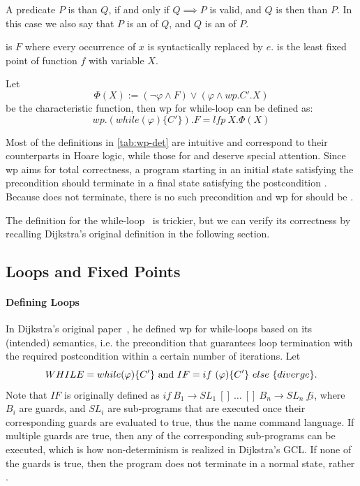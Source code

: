 A predicate $P$ is  than $Q$, if and only if $Q\implies P$ is valid, and $Q$ is then  than $P$. 
In this case we also say that $P$ is an  of $Q$, and $Q$ is an  of $P$. 

 is $F$ where every occurrence of $x$ is syntactically replaced by $e$. 
 is the least fixed point of function $f$ with variable $X$. 

Let {$$\Phi(X):=(\neg\varphi\wedge F)\vee(\varphi\wedge wp.C'.X)$$} be the characteristic function, then wp for while-loop can be defined as: 
{$$wp.(while(\varphi)\{C'\}).F = lfp\ X. \Phi(X)$$}

Most of the definitions in \autoref{tab:wp-det} are intuitive and correspond to their counterparts in Hoare logic, while those for  and  deserve special attention. 
Since wp aims for total correctness, a program starting in an initial state satisfying the precondition  should terminate in a final state satisfying the postcondition . 
Because  does not terminate, there is no such precondition and wp for  should be . 

The definition for the while-loop~\cite{kaminski19} is trickier, but we can verify its correctness by recalling Dijkstra's original definition in the following section. 


\subsection{Loops and Fixed Points}\label{sec:define loops}
\paragraph{Defining Loops}
In Dijkstra's original paper~\cite{dijkstra75}, he defined wp for while-loops based on its (intended) semantics, i.e. the precondition that guarantees loop termination with the required postcondition within a certain number of iterations. 
Let 
\[
WHILE=while(\varphi)\{C'\}
\\\text{ and } \\ 
IF=  if\ (\varphi)\{C'\}\ else\ \{diverge\}. 
\] 
Note that $IF$ is originally defined as $\underline{if}\ B_1 \to SL_1 \ []\ \dots\ []\ B_n\to SL_n\ \underline{fi}$, where $B_i$ are guards, and $SL_i$ are sub-programs that are executed once their corresponding guards are evaluated to true, thus the name  command language.
If multiple guards are true, then any of the corresponding sub-programs can be executed, which is how non-determinism is realized in Dijkstra's GCL. 
If none of the guards is true, then the program does not terminate in a normal state, rather . 

